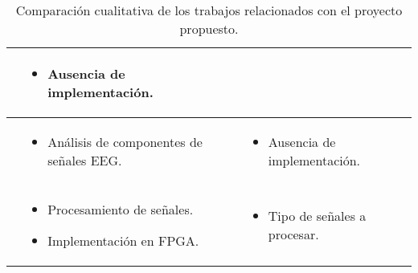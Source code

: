 \begin{table}[ht!]
\begin{tabular}{p{} p{} p{}}
\begin{itemize}[leftmargin=*]
    \end{itemize} &
    \begin{itemize}[leftmargin=*] 
        \item Ausencia de implementaci\'on.
    \end{itemize} \\
    \midrule
    \cite{Dino2018} &
    \begin{itemize}[leftmargin=*]
        \item An\'alisis de componentes de se\~nales EEG.
    \end{itemize} &
    \begin{itemize}[leftmargin=*]
        \item Ausencia de implementaci\'on.
    \end{itemize} \\
    \midrule
        \cite{Chacon14} &
    \begin{itemize}[leftmargin=*]
        \item Procesamiento de se\~nales.
        \item Implementaci\'on en FPGA.
    \end{itemize} &
    \begin{itemize}[leftmargin=*]
        \item Tipo de se\~nales a procesar. 
    \end{itemize} \\
    \bottomrule
  \end{tabular}
  \caption{Comparación cualitativa de los trabajos relacionados con el proyecto propuesto.}
  \label{table:related}
\end{table}
\newpage

